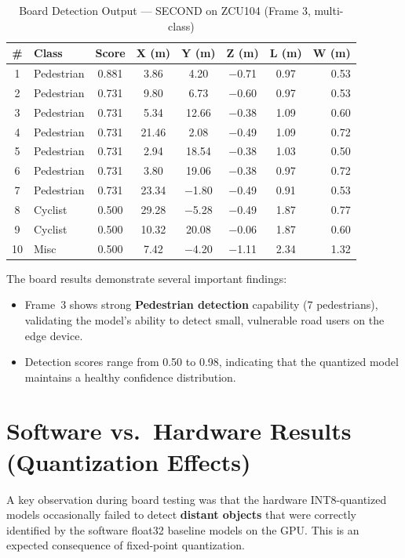 \documentclass[12pt, a4paper]{report}
\begin{document}
\begin{table}[H]
\centering
\caption{Board Detection Output --- SECOND on ZCU104 (Frame 3, multi-class)}
\label{tab:second_board_0003}
\begin{tabular}{@{}clcccccr@{}}
\toprule
\textbf{\#} & \textbf{Class} & \textbf{Score} & \textbf{X (m)} & \textbf{Y (m)} & \textbf{Z (m)} & \textbf{L (m)} & \textbf{W (m)} \\
\midrule
1 & Pedestrian & 0.881 & 3.86 & 4.20 & $-$0.71 & 0.97 & 0.53 \\
2 & Pedestrian & 0.731 & 9.80 & 6.73 & $-$0.60 & 0.97 & 0.53 \\
3 & Pedestrian & 0.731 & 5.34 & 12.66 & $-$0.38 & 1.09 & 0.60 \\
4 & Pedestrian & 0.731 & 21.46 & 2.08 & $-$0.49 & 1.09 & 0.72 \\
5 & Pedestrian & 0.731 & 2.94 & 18.54 & $-$0.38 & 1.03 & 0.50 \\
6 & Pedestrian & 0.731 & 3.80 & 19.06 & $-$0.38 & 0.97 & 0.72 \\
7 & Pedestrian & 0.731 & 23.34 & $-$1.80 & $-$0.49 & 0.91 & 0.53 \\
8 & Cyclist & 0.500 & 29.28 & $-$5.28 & $-$0.49 & 1.87 & 0.77 \\
9 & Cyclist & 0.500 & 10.32 & 20.08 & $-$0.06 & 1.87 & 0.60 \\
10 & Misc & 0.500 & 7.42 & $-$4.20 & $-$1.11 & 2.34 & 1.32 \\

\bottomrule
\end{tabular}
\end{table}

The board results demonstrate several important findings:
\begin{itemize}[nosep]
    \item Frame~3 shows strong \textbf{Pedestrian detection} capability (7 pedestrians), validating the model's ability to detect small, vulnerable road users on the edge device.
    \item Detection scores range from 0.50 to 0.98, indicating that the quantized model maintains a healthy confidence distribution.
\end{itemize}


\section{Software vs.\ Hardware Results (Quantization Effects)}

A key observation during board testing was that the hardware INT8-quantized models occasionally failed to detect \textbf{distant objects} that were correctly identified by the software float32 baseline models on the GPU. This is an expected consequence of fixed-point quantization.
\end{document}
